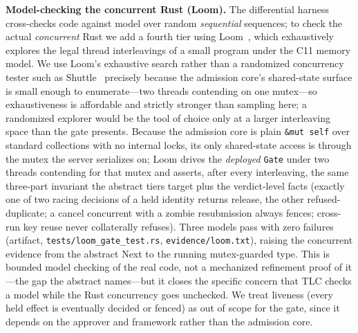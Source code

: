 \documentclass[10pt,journal,compsoc]{IEEEtran}
\begin{document}
\smallskip\noindent\textbf{Model-checking the concurrent Rust (Loom).}
The differential harness cross-checks code against model over random
\emph{sequential} sequences; to check the actual \emph{concurrent} Rust we add
a fourth tier using Loom~\cite{loom}, which exhaustively explores the legal
thread interleavings of a small program under the C11 memory model. We use
Loom's exhaustive search rather than a randomized concurrency tester such as
Shuttle~\cite{shuttle} precisely because the admission core's shared-state
surface is small enough to enumerate---two threads contending on one
mutex---so exhaustiveness is affordable and strictly stronger than sampling
here; a randomized explorer would be the tool of choice only at a larger
interleaving space than the gate presents. Because
the admission core is plain \texttt{\&mut self} over standard collections with
no internal locks, its only shared-state access is through the mutex the
server serializes on; Loom drives the \emph{deployed} \texttt{Gate} under two
threads contending for that mutex and asserts, after every interleaving, the
same three-part invariant the abstract tiers target plus the verdict-level
facts (exactly one of two racing decisions of a held identity returns
\textsf{release}, the other \textsf{refused-duplicate}; a cancel concurrent
with a zombie resubmission always fences; cross-run key reuse never
collaterally refuses). Three models pass with zero failures
(artifact, \texttt{tests/loom\_gate\_test.rs}, \texttt{evidence/loom.txt}),
raising the concurrent evidence from the abstract \textsf{Next} to the running
mutex-guarded type. This is bounded model checking of the real code, not a
mechanized refinement proof of it---the gap the abstract names---but it closes
the specific concern that TLC checks a model while the Rust concurrency goes
unchecked.
We treat liveness (every held effect is eventually
decided or fenced) as out of scope for the gate, since it depends on the
approver and framework rather than the admission core.
\end{document}
